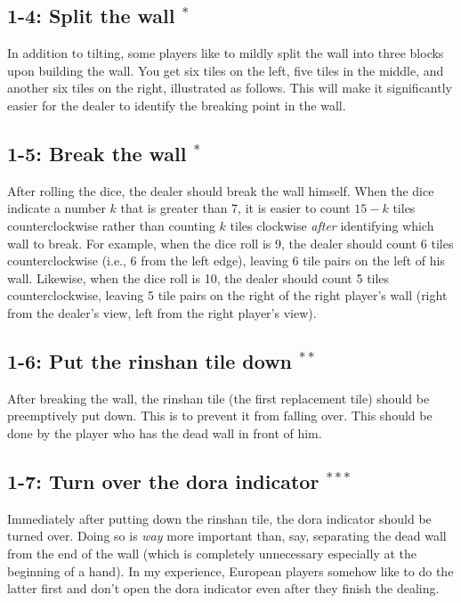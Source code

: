 \subsection*{1-4: Split the wall $^{*}$}
In addition to tilting, some players like to mildly split the wall into three blocks upon building the wall. You get six tiles on the left, five tiles in the middle, and another six tiles on the right, illustrated as follows. 
\bp
{}
\ep
This will make it significantly easier for the dealer to identify the breaking point in the wall. 

\subsection*{1-5: Break the wall $^{*}$}
After rolling the dice, the dealer should break the wall himself. When the dice indicate a number $k$ that is greater than 7, it is easier to count $15-k$ tiles counterclockwise rather than counting $k$ tiles clockwise \emph{after} identifying which wall to break. 
For example, when the dice roll is 9, the dealer should count 6 tiles counterclockwise (i.e., 6 from the left edge), leaving 6 tile pairs on the left of his wall. Likewise, when the dice roll is 10, the dealer should count 5 tiles counterclockwise, leaving 5 tile pairs on the right of the right player's wall (right from the dealer's view, left from the right player's view). 

\subsection*{1-6: Put the {\jap rinshan} tile down $^{**}$}
After breaking the wall, the {\jap rinshan} tile (the first replacement tile) should be preemptively put down. This is to prevent it from falling over. This should be done by the player who has the dead wall in front of him. 

\subsection*{1-7: Turn over the {\jap dora} indicator $^{***}$}
Immediately after putting down the {\jap rinshan} tile, the {\jap dora} indicator should be turned over. Doing so is \emph{way} more important than, say, separating the dead wall from the end of the wall (which is completely unnecessary especially at the beginning of a hand). In my experience, European players somehow like to do the latter first and don't open the {\jap dora} indicator even after they finish the dealing. 

